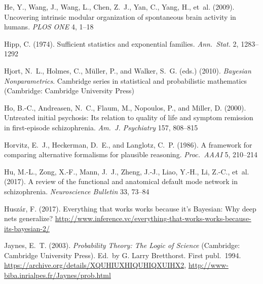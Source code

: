 \documentclass[%
]{frontiersSCNS-nologo} %
\renewcommand*{\|}{\mathpunct{|}}%
\begin{document}
\begin{thebibliography}{156}
He, Y., Wang, J., Wang, L., Chen, Z.~J., Yan, C., Yang, H., et~al. (2009).
\newblock Uncovering intrinsic modular organization of spontaneous brain
  activity in humans.
\newblock \emph{PLOS ONE} 4, 1--18

Hipp, C. (1974).
\newblock Sufficient statistics and exponential families.
\newblock \emph{Ann.\ Stat.} 2, 1283--1292

Hjort, N.~L., Holmes, C., M{\"u}ller, P., and Walker, S.~G. (eds.) (2010).
\newblock \emph{Bayesian Nonparametrics}.
\newblock Cambridge series in statistical and probabilistic mathematics
  (Cambridge: Cambridge University Press)

Ho, B.-C., Andreasen, N.~C., Flaum, M., Nopoulos, P., and Miller, D. (2000).
\newblock Untreated initial psychosis: Its relation to quality of life and
  symptom remission in first-episode schizophrenia.
\newblock \emph{Am.\ J. Psychiatry} 157, 808--815

Horvitz, E.~J., Heckerman, D.~E., and Langlotz, C.~P. (1986).
\newblock A framework for comparing alternative formalisms for plausible
  reasoning.
\newblock \emph{Proc.\ AAAI} 5, 210--214

Hu, M.-L., Zong, X.-F., Mann, J.~J., Zheng, J.-J., Liao, Y.-H., Li, Z.-C.,
  et~al. (2017).
\newblock A review of the functional and anatomical default mode network in
  schizophrenia.
\newblock \emph{Neuroscience Bulletin} 33, 73--84

Husz{\'a}r, F. (2017).
\newblock Everything that works works because it's {Bayesian}: Why deep nets
  generalize?
\newblock
  \url{http://www.inference.vc/everything-that-works-works-because-its-bayesian-2/}

Jaynes, E.~T. (2003).
\newblock \emph{Probability Theory: The Logic of Science} (Cambridge: Cambridge
  University Press).
\newblock Ed.\ by G. Larry Bretthorst. First publ.\ 1994.
  \url{https://archive.org/details/XQUHIUXHIQUHIQXUIHX2},
  \url{http://www-biba.inrialpes.fr/Jaynes/prob.html}


\end{thebibliography}
\end{document}
